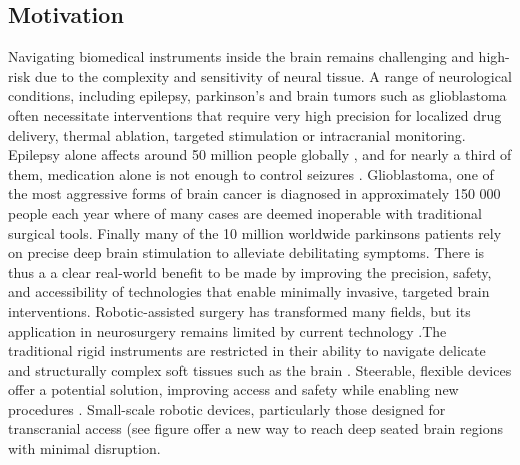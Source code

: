 



\subsection{Motivation}

Navigating biomedical instruments inside the brain remains challenging and high-risk due to the complexity and sensitivity of neural tissue. A range of neurological conditions, including epilepsy, parkinson's and brain tumors such as glioblastoma often necessitate interventions that require very high precision for localized drug delivery, thermal ablation, targeted stimulation or intracranial monitoring. Epilepsy alone affects around 50 million people globally \cite{noauthor_epilepsy_nodate}, and for nearly a third of them, medication alone is not enough to control seizures \cite{sultana_incidence_2021}. Glioblastoma, one of the most aggressive forms of brain cancer is diagnosed in approximately 150 000 people each year \cite{walsh_chapter_2016} where of many cases are deemed inoperable with traditional surgical tools. Finally many of the 10 million worldwide parkinsons patients \cite{noauthor_statistics_nodate} rely on precise deep brain stimulation to alleviate debilitating symptoms. There is thus a a clear real-world benefit to be made by improving the precision, safety, and accessibility of technologies that enable minimally invasive, targeted brain interventions.
\newline \newline
Robotic-assisted surgery has transformed many fields, but its application in neurosurgery remains limited by current technology \cite{doulgeris_robotics_2015}.The traditional rigid instruments are restricted in their ability to navigate delicate and structurally complex soft tissues such as the brain \cite{noseda_flat_2024}. Steerable, flexible devices offer a potential solution, improving access and safety while enabling new procedures \cite{da_veiga_challenges_2020}. Small-scale robotic devices, particularly those designed for transcranial access (see figure  offer a new way to reach deep seated brain regions with minimal disruption.

